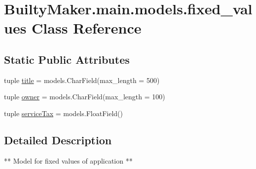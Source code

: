 \hypertarget{classBuiltyMaker_1_1main_1_1models_1_1fixed__values}{\section{\-Builty\-Maker.\-main.\-models.\-fixed\-\_\-values \-Class \-Reference}
\label{classBuiltyMaker_1_1main_1_1models_1_1fixed__values}
}
\subsection*{\-Static \-Public \-Attributes}
\begin{DoxyCompactItemize}
\item 
tuple \hyperlink{classBuiltyMaker_1_1main_1_1models_1_1fixed__values_ab16de8741c77253e9b5cc51653610369}{title} = models.\-Char\-Field(max\-\_\-length = 500)
\item 
tuple \hyperlink{classBuiltyMaker_1_1main_1_1models_1_1fixed__values_af1599b91b0c6285ab5f5fd3bcd3fc98f}{owner} = models.\-Char\-Field(max\-\_\-length = 100)
\item 
tuple \hyperlink{classBuiltyMaker_1_1main_1_1models_1_1fixed__values_a63d688b696cd1f58a0f9559b8c7610e4}{service\-Tax} = models.\-Float\-Field()
\end{DoxyCompactItemize}


\subsection{\-Detailed \-Description}
\begin{DoxyVerb}
   **  Model for fixed values of application **
\end{DoxyVerb}
 

